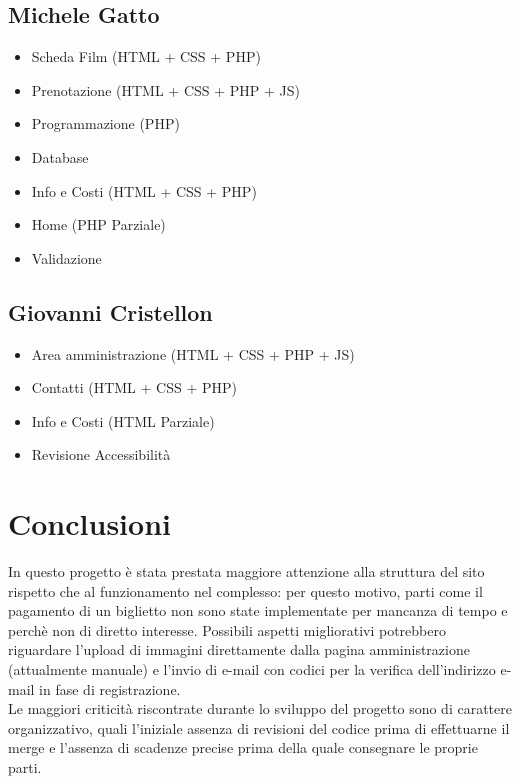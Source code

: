 \documentclass[a4paper, 12pt]{article}
\begin{document}
\subsection{Michele Gatto}
\begin{itemize}
    \item Scheda Film (HTML + CSS + PHP)
    \item Prenotazione (HTML + CSS + PHP + JS)
    \item Programmazione (PHP)
    \item Database
    \item Info e Costi (HTML + CSS + PHP)
    \item Home (PHP Parziale)
    \item Validazione
\end{itemize}
\subsection{Giovanni Cristellon}
\begin{itemize}
    \item Area amministrazione (HTML + CSS + PHP + JS)
    \item Contatti (HTML + CSS + PHP)
    \item Info e Costi (HTML Parziale)
    \item Revisione Accessibilità
\end{itemize}

\section{Conclusioni}
In questo progetto è stata prestata maggiore attenzione alla struttura del sito rispetto che al funzionamento nel complesso: per questo motivo, parti come il pagamento di un biglietto non sono state implementate
per mancanza di tempo e perchè non di diretto interesse. Possibili aspetti migliorativi potrebbero riguardare l'upload di immagini direttamente dalla pagina amministrazione (attualmente manuale) e l'invio di e-mail con codici per la verifica dell'indirizzo e-mail in fase di registrazione.\\
Le maggiori criticità riscontrate durante lo sviluppo del progetto sono di carattere organizzativo, quali l'iniziale assenza di revisioni del codice prima di effettuarne il merge e l'assenza di scadenze precise prima della quale consegnare le proprie parti.
\end{document}
